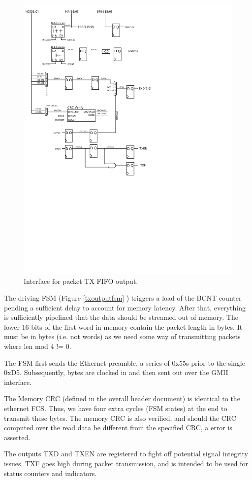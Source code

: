 \begin{figure}
\label{txoutput}
\includegraphics[scale=0.7]{txoutput.svg}
\caption{Interface for packet TX FIFO output.}
\end{figure}

The driving FSM (Figure \ref{txoutputfsm} ) triggers a load of the
BCNT counter pending a sufficient delay to account for memory latency.
After that, everything is sufficiently pipelined that the data should
be streamed out of memory. The lower 16 bits of the first word in
memory contain the packet length in bytes. It must be in bytes (i.e.
not words) as we need some way of transmitting packets where len mod 4
!= 0.

The FSM first sends the Ethernet preamble, a series of 0x55s prior to
the single 0xD5.  Subsequently, bytes are clocked in and then sent out
over the GMII interface.

The Memory CRC (defined in the overall header document) is identical
to the ethernet FCS. Thus, we have four extra cycles (FSM states) at
the end to transmit these bytes. The memory CRC is also verified, and
should the CRC computed over the read data be different from the
specified CRC, a  error is asserted.

The outputs TXD and TXEN are registered to fight off potential signal
integrity issues. TXF goes high during packet transmission, and is
intended to be used for status counters and indicators.
